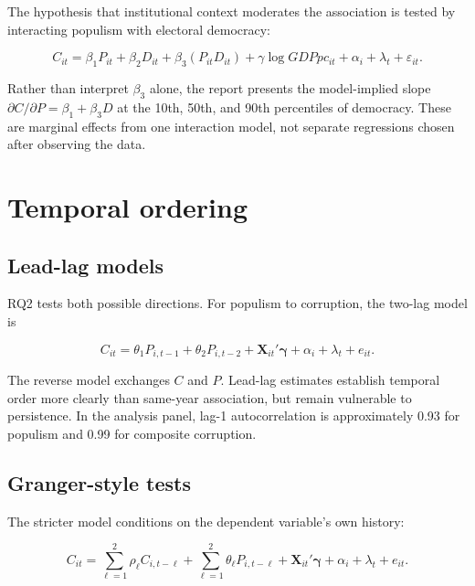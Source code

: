 The hypothesis that institutional context moderates the association is tested by interacting populism
with electoral democracy:

\begin{equation}
  C_{it} = \beta_1 P_{it} + \beta_2 D_{it} + \beta_3(P_{it}D_{it})
  + \gamma\log GDPpc_{it} + \alpha_i + \lambda_t + \varepsilon_{it}.
\end{equation}

Rather than interpret $\beta_3$ alone, the report presents the model-implied slope
$\partial C/\partial P = \beta_1 + \beta_3D$ at the 10th, 50th, and 90th percentiles of democracy.
These are marginal effects from one interaction model, not separate regressions chosen after observing
the data.

\section{Temporal ordering}

\subsection{Lead-lag models}

RQ2 tests both possible directions. For populism to corruption, the two-lag model is

\begin{equation}
  C_{it} = \theta_1 P_{i,t-1} + \theta_2 P_{i,t-2}
  + \mathbf{X}_{it}'\boldsymbol{\gamma} + \alpha_i + \lambda_t + e_{it}.
  \label{eq:leadlag}
\end{equation}

The reverse model exchanges $C$ and $P$. Lead-lag estimates establish temporal order more clearly than
same-year association, but remain vulnerable to persistence. In the analysis panel, lag-1
autocorrelation is approximately 0.93 for populism and 0.99 for composite corruption.

\subsection{Granger-style tests}

The stricter model conditions on the dependent variable's own history:

\begin{equation}
  C_{it} = \sum_{\ell=1}^{2}\rho_{\ell} C_{i,t-\ell}
  + \sum_{\ell=1}^{2}\theta_{\ell} P_{i,t-\ell}
  + \mathbf{X}_{it}'\boldsymbol{\gamma} + \alpha_i + \lambda_t + e_{it}.
  \label{eq:granger}
\end{equation}

